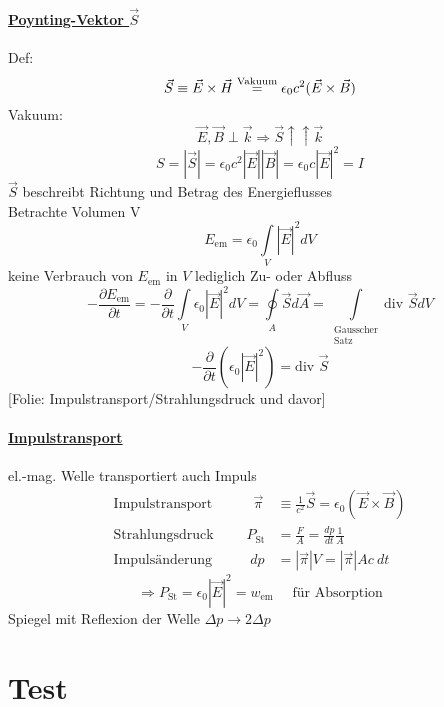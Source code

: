 \documentclass[titlepage,12pt,a4paper,ngerman]{report}
\newcommand{\tx}[1]{\textrm{#1}}
\newcommand{\folie}[1]{\color{gray}[Folie: #1]\color{black}}
\begin{document}
\subsubsection{\underline{Poynting-Vektor $ \vec{S} $}}
Def:
$$ \vec{S} \equiv \vec{E} \times \vec{H} \buildrel \tx{Vakuum} \over = \epsilon_0 c^2 (\vec{E} \times \vec{B}) $$
Vakuum:
$$\vec{E} , \vec{B} \perp \vec{k} \Rightarrow \vec{S} \uparrow\uparrow \vec{k}$$
$$S = |\vec{S}| = \epsilon_0 c^2 |\vec{E}| |\vec{B}| = \epsilon_0 c |\vec{E}|^2 = I$$
$ \vec{S} $ beschreibt Richtung und Betrag des Energieflusses\\
Betrachte Volumen V
$$E_{\tx{em}} = \epsilon_0 \int\limits_V |\vec{E}|^2 dV$$
keine Verbrauch von $ E_{\tx{em}} $ in $ V $ lediglich Zu- oder Abfluss
\begin{equation*}
- \frac{\partial E_{\tx{em}}}{\partial t} = - \frac{\partial }{\partial t} \int\limits_V \epsilon_0 |\vec{E}|^2 dV = \oint\limits_A \vec{S} d\vec{A} = \int\limits_{\substack{\tx{Gausscher}\\\tx{Satz}}} \tx{div } \vec{S} dV
\end{equation*}
\begin{equation*}
\boxed{-\frac{\partial}{\partial t} (\epsilon_0 |\vec{E}|^2) = \tx{div }\vec{S} } 
\end{equation*}
\folie{Impulstransport/Strahlungsdruck und davor}
\subsubsection{\underline{Impulstransport}}
el.-mag. Welle transportiert auch Impuls\\


\begin{align*}
\tx{Impulstransport }\qquad \ \ \,\vec{\pi} &\equiv \frac{1}{c^2} \vec{S} = \epsilon_0 (\vec{E} \times \vec{B})\\[5pt]
\tx{Strahlungsdruck }\qquad P_{\tx{St}} &= \frac{F}{A} = \frac{dp}{dt} \frac{1}{A}\\[5pt]
\tx{Impulsänderung }\qquad \ \, dp &= |\vec{\pi}| V = |\vec{\pi}| A c \ dt
\end{align*}
$$\Rightarrow P_{\tx{St}} = \epsilon_0 |\vec{E}|^2 = w_{\tx{em}} \quad \tx{ für Absorption}$$
Spiegel mit Reflexion der Welle $ \Delta p \rightarrow 2 \Delta p $

\chapter{Test}
\end{document}
